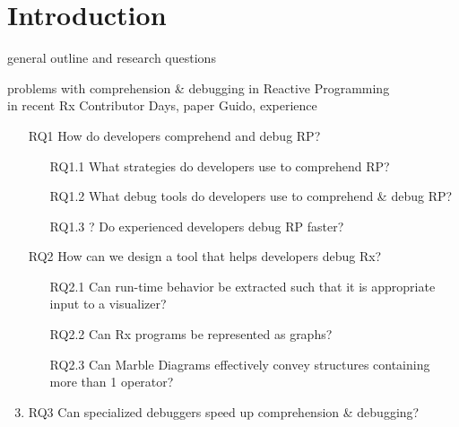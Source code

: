 \section{Introduction}
general outline and research questions

problems with comprehension \& debugging in Reactive Programming \\
in recent Rx Contributor Days, paper Guido, experience

\begin{enumerate}
	\item[RQ1] How do developers comprehend and debug RP?
	\begin{enumerate}
		\item[RQ1.1] What strategies do developers use to comprehend RP?
		\item[RQ1.2] What debug tools do developers use to comprehend \& debug RP?
		\item[RQ1.3] ? Do experienced developers debug RP faster?
	\end{enumerate}

	\item[RQ2] How can we design a tool that helps developers debug Rx?
	\begin{enumerate}
		\item[RQ2.1] Can run-time behavior be extracted such that it is appropriate input to a visualizer?
		\item[RQ2.2] Can Rx programs be represented as graphs?
		\item[RQ2.3] Can Marble Diagrams effectively convey structures containing more than 1 operator?
	\end{enumerate}
		
	\item{RQ3} Can specialized debuggers speed up comprehension \& debugging?
\end{enumerate}
